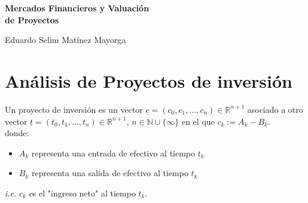 





\begin{titlingpage} %

    \raggedleft %
	
	\vspace*{\baselineskip} %
	
	\vspace*{0.25\textheight} %
	
    
    \vspace*{0.1\textheight}

    {\Huge{\textbf{Mercados Financieros y Valuación\\ de Proyectos}}}\\[\baselineskip] %
    \vspace*{0.1\textheight}

    
    {\Large Eduardo Selim Matínez Mayorga}\\[\baselineskip]
	
	\vfill

\end{titlingpage}

\thispagestyle{empty}

\chapter*{Análisis de Proyectos de inversión}


\begin{definition} Un proyecto de inversión es un vector $\underline{c} = (c_0, c_1, ... , c_n)\in \mathbb{R}^{n+1}$ asociado a otro vector $\underline{t} = (t_0, t_1, ... , t_n)\in \mathbb{R}^{n+1}$, $n\in\mathbb{N}\cup\{\infty\}$ en el que $c_k :=A_k-B_k$.\\
donde:
\begin{itemize}
    \item $A_k$ representa una entrada de efectivo al tiempo $t_k$
    \item $B_k$ representa una salida de efectivo al tiempo $t_k$
\end{itemize}
\textit{i.e.} $c_k$ es el "ingreso neto" al tiempo $t_k$.
\end{definition}

